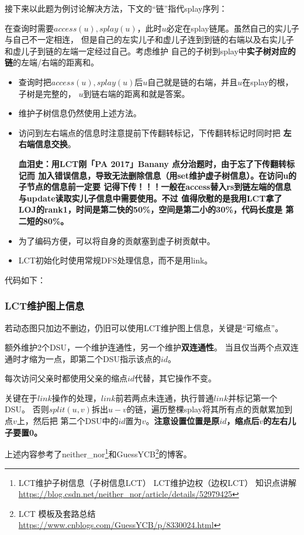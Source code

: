 接下来以此题为例讨论解决方法，下文的``链''指代splay序列：

在查询时需要$access(u),splay(u)$，此时$u$必定在splay链尾。虽然自己的实儿子与自己不一定相连，
但是自己的左实儿子和虚儿子连到到链的右端以及右实儿子和虚儿子到链的左端一定经过自己。考虑维护
自己的子树到splay中{\bfseries 实子树对应的链}的左端/右端的距离和。
\begin{itemize}
    \item 查询时把$access(u),splay(u)$后$u$自己就是链的右端，并且$u$在splay的根，子树是完整的，
    $u$到链右端的距离和就是答案。
    \item 维护子树信息仍然使用上述方法。
    \item 访问到左右端点的信息时注意提前下传翻转标记，下传翻转标记时同时把{\bfseries
    左右端信息交换}。

    {\bfseries 血泪史：用LCT刚「PA 2017」Banany 点分治题时，由于忘了下传翻转标记而
    加入错误信息，导致无法删除信息（用set维护虚子树信息）。在访问u的子节点的信息前一定要
    记得下传！！！一般在access替入rs到链左端的信息与update读取实儿子信息中需要使用。不过
    值得欣慰的是我用LCT拿了LOJ的rank1，时间是第二快的50\%，空间是第二小的30\%，代码长度是
    第二短的80\%。}
    \item 为了编码方便，可以将自身的贡献塞到虚子树贡献中。
    \item LCT初始化时使用常规DFS处理信息，而不是用link。
\end{itemize}

代码如下：


\subsubsection{LCT维护图上信息}
若动态图只加边不删边，仍旧可以使用LCT维护图上信息，关键是``可缩点''。

额外维护2个DSU，一个维护连通性，另一个维护{\bfseries 双连通性}。
当且仅当两个点双连通时才缩为一点，即第二个DSU指示该点的$id$。

每次访问父亲时都使用父亲的缩点$id$代替，其它操作不变。

关键在于$link$操作的处理，$link$前若两点未连通，执行普通$link$并标记第一个DSU。
否则$split(u,v)$拆出$u-v$的链，遍历整棵splay将其所有点的贡献累加到点$v$上，然后把
第二个DSU中的$id$置为$v$。{\bfseries 注意设置位置是原$id$，缩点后$v$的左右儿子要置0。}

上述内容参考了neither\_nor\footnote{
    LCT维护子树信息（子树信息LCT） LCT维护边权（边权LCT） 知识点讲解
    \url{https://blog.csdn.net/neither\_nor/article/details/52979425}
}和GuessYCB\footnote{
    LCT 模板及套路总结
    \url{https://www.cnblogs.com/GuessYCB/p/8330024.html}
}的博客。


